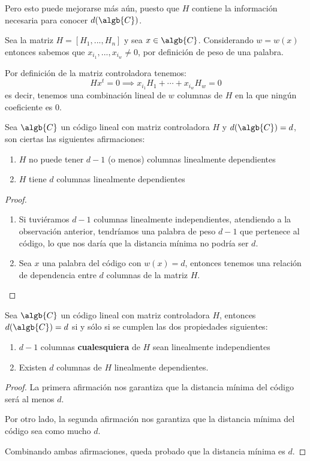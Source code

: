 Pero esto puede mejorarse más aún, puesto que $H$ contiene la información necesaria para conocer $d(\algb{C})$.

\begin{obs}
Sea la matriz $H=[H_1,...,H_n]$ y sea $x \in \algb{C}$. Considerando $w=w(x)$ entonces sabemos que $x_{i_1},...,x_{i_w}\neq 0$, por definición de peso de una palabra.

Por definición de la matriz controladora tenemos:
\[Hx^t=0 \implies x_{i_1}H_1 + \cdots + x_{i_w}H_w = 0\]
es decir, tenemos una combinación lineal de $w$ columnas de $H$ en la que ningún coeficiente es 0.
\end{obs}

\begin{prop}
Sea $\algb{C}$ un código lineal con matriz controladora $H$ y $d(\algb{C})=d$, son ciertas las siguientes afirmaciones:
\begin{enumerate}
\item $H$ no puede tener $d-1$ (o menos) columnas linealmente dependientes
\item $H$ tiene $d$ columnas linealmente dependientes
\end{enumerate}
\end{prop}
\begin{proof}
\begin{enumerate}
\item Si tuviéramos $d-1$ columnas linealmente independientes, atendiendo a la observación anterior, tendríamos una palabra de peso $d-1$ que pertenece al código, lo que nos daría que la distancia mínima no podría ser $d$.

\item Sea $x$ una palabra del código con $w(x)=d$, entonces tenemos una relación de dependencia entre $d$ columnas de la matriz $H$.
\end{enumerate}
\end{proof}

\begin{corol}
Sea $\algb{C}$ un código lineal con matriz controladora $H$, entonces $d(\algb{C})=d$ si y sólo si se cumplen las dos propiedades siguientes:
\begin{enumerate}
\item $d-1$ columnas \textbf{cualesquiera} de $H$ sean linealmente independientes
\item Existen $d$ columnas de $H$ linealmente dependientes.
\end{enumerate}
\end{corol}
\begin{proof}
La primera afirmación nos garantiza que la distancia mínima del código será al menos $d$.

Por otro lado, la segunda afirmación nos garantiza que la distancia mínima del código sea como mucho $d$.

Combinando ambas afirmaciones, queda probado que la distancia mínima es $d$.
\end{proof}

